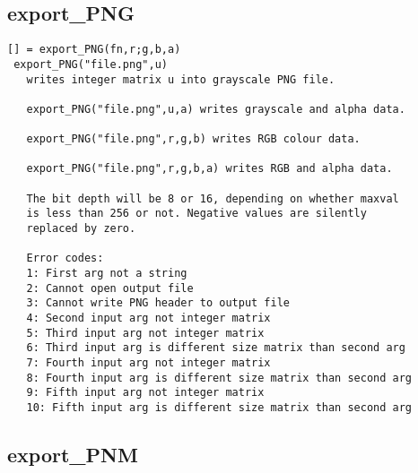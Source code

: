 \documentclass[a4paper]{article}
\begin{document}
\subsection{export\_PNG\label{export_PNG}}

\begin{tscreen}
\begin{verbatim}
[] = export_PNG(fn,r;g,b,a)
 export_PNG("file.png",u)
   writes integer matrix u into grayscale PNG file.

   export_PNG("file.png",u,a) writes grayscale and alpha data.

   export_PNG("file.png",r,g,b) writes RGB colour data.

   export_PNG("file.png",r,g,b,a) writes RGB and alpha data.

   The bit depth will be 8 or 16, depending on whether maxval
   is less than 256 or not. Negative values are silently
   replaced by zero.
   
   Error codes:
   1: First arg not a string
   2: Cannot open output file
   3: Cannot write PNG header to output file
   4: Second input arg not integer matrix
   5: Third input arg not integer matrix
   6: Third input arg is different size matrix than second arg
   7: Fourth input arg not integer matrix
   8: Fourth input arg is different size matrix than second arg
   9: Fifth input arg not integer matrix
   10: Fifth input arg is different size matrix than second arg
\end{verbatim}
\end{tscreen}



\subsection{export\_PNM\label{export_PNM}}
\end{document}
